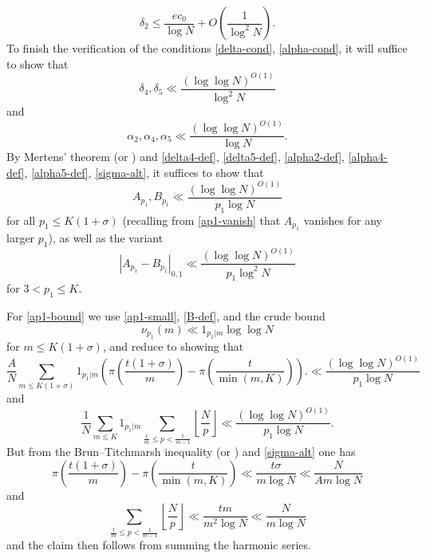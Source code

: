 \documentclass[12pt,a4paper,reqno]{amsart}
\numberwithin{equation}{section}
\theoremstyle{plain}
\theoremstyle{definition}
\begin{document}
$$ \delta_2 \leq \frac{ec_0}{\log N} + O\left( \frac{1}{\log^2 N} \right).$$
To finish the verification of the conditions \eqref{delta-cond}, \eqref{alpha-cond}, it will suffice to show that
\begin{equation}\label{delta-remaining}
\delta_4, \delta_5 \ll \frac{(\log\log N)^{O(1)}}{\log^2 N}
\end{equation}
and
\begin{equation}\label{alpha-remaining}
\alpha_2, \alpha_4, \alpha_5 \ll \frac{(\log\log N)^{O(1)}}{\log N}.
\end{equation}
By Mertens' theorem (or ) and \eqref{delta4-def}, \eqref{delta5-def}, \eqref{alpha2-def}, \eqref{alpha4-def}, \eqref{alpha5-def}, \eqref{sigma-alt}, it suffices to show that
\begin{equation}\label{ap1-bound}
A_{p_1}, B_{p_1} \ll \frac{(\log\log N)^{O(1)}}{p_1 \log N} 
\end{equation}
for all $p_1 \leq K(1+\sigma)$ (recalling from \eqref{ap1-vanish} that $A_{p_1}$ vanishes for any larger $p_1$), as well as the variant
\begin{equation}\label{ap1-diff}
  |A_{p_1}-B_{p_1}|_{0,1} \ll \frac{(\log\log N)^{O(1)}}{p_1 \log^2 N}
\end{equation}
for $3 < p_1 \leq K$.

For \eqref{ap1-bound} we use \eqref{ap1-small}, \eqref{B-def}, and the crude bound 
\begin{equation}\label{crude}
  \nu_{p_1}(m) \ll 1_{p_1|m} \log\log N
\end{equation}
 for $m \leq K(1+\sigma)$, and reduce to showing that
$$ \frac{A}{N} \sum_{m \leq K(1+\sigma)} 1_{p_1|m} \left( \pi\left(\frac{t(1+\sigma)}{m}\right) - \pi\left(\frac{t}{\min(m,K)} \right) \right).
\ll \frac{(\log\log N)^{O(1)}}{p_1 \log N}$$
and
$$ \frac{1}{N} \sum_{m \leq K} 1_{p_1|m} \sum_{\frac{t}{m} \leq p < \frac{t}{m-1}} \left \lfloor \frac{N}{p} \right\rfloor \ll
\frac{(\log\log N)^{O(1)}}{p_1 \log N}.$$ 
But from the Brun--Titchmarsh inequality (or ) and \eqref{sigma-alt} one has
$$ \pi\left(\frac{t(1+\sigma)}{m}\right) - \pi\left(\frac{t}{\min(m,K)}\right) \ll \frac{t\sigma}{m \log N} \ll \frac{N}{Am \log N}$$
and
$$ \sum_{\frac{t}{m} \leq p < \frac{t}{m-1}} \left \lfloor \frac{N}{p} \right\rfloor \ll \frac{tm}{m^2 \log N} \ll \frac{N}{m \log N}$$
and the claim then follows from summing the harmonic series.
\end{document}
